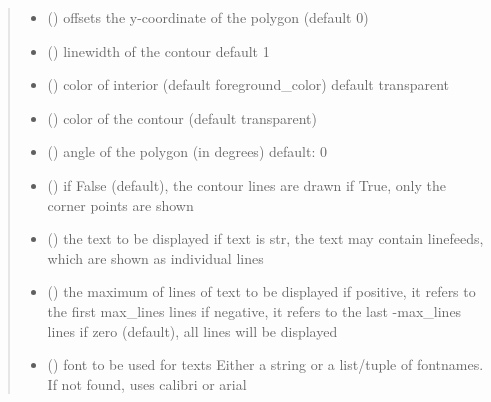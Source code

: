 \documentclass[letterpaper,10pt,english]{sphinxmanual}
\begin{document}
\begin{fulllineitems}
\begin{quote}
\begin{description}
\begin{itemize}
\item {} 
 () \textendash{} offsets the y-coordinate of the polygon (default 0)

\item {} 
 () \textendash{} linewidth of the contour 
default 1

\item {} 
 () \textendash{} color of interior (default foreground\_color) 
default transparent

\item {} 
 () \textendash{} color of the contour (default transparent)

\item {} 
 () \textendash{} angle of the polygon (in degrees) 
default: 0

\item {} 
 () \textendash{} if False (default), the contour lines are drawn 
if True, only the corner points are shown

\item {} 
 (\sphinxstyleliteralemphasis{\sphinxupquote{, }}) \textendash{} the text to be displayed 
if text is str, the text may contain linefeeds, which are shown as individual lines

\item {} 
 () \textendash{} the maximum of lines of text to be displayed 
if positive, it refers to the first max\_lines lines 
if negative, it refers to the last -max\_lines lines 
if zero (default), all lines will be displayed

\item {} 
 () \textendash{} font to be used for texts 
Either a string or a list/tuple of fontnames.
If not found, uses calibri or arial


\end{itemize}
\end{description}
\end{quote}
\end{fulllineitems}
\end{document}
